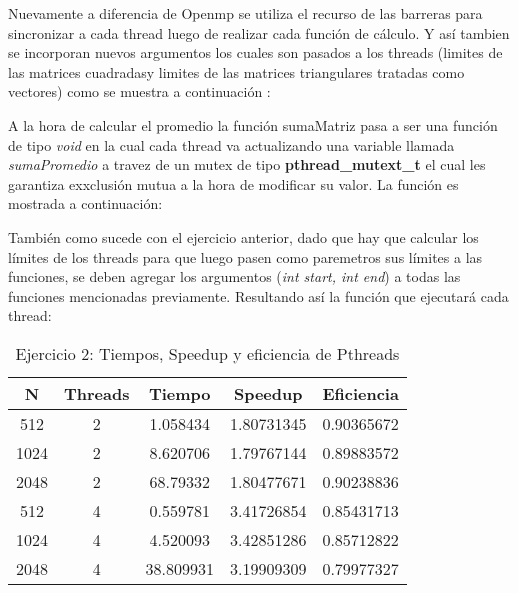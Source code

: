 Nuevamente a diferencia de Openmp se utiliza el recurso de las barreras para sincronizar a cada thread luego de realizar cada función de cálculo. Y así tambien se incorporan nuevos argumentos los cuales son pasados a los threads (limites de las matrices cuadradasy limites de las matrices triangulares tratadas como vectores) como se muestra a continuación :


A la hora de calcular el promedio la función sumaMatriz pasa a ser una función de tipo \textit{void} en la cual cada thread va actualizando una variable llamada \textit{sumaPromedio} a travez de un mutex de tipo \textbf{pthread\_mutext\_t} el cual les garantiza exxclusión mutua a la hora de modificar su valor. La función es mostrada a continuación:


También como sucede con el ejercicio anterior, dado que hay que calcular los límites de los threads para que luego pasen como paremetros sus límites a las funciones, se deben agregar los argumentos (\textit{int start, int end}) a todas las funciones mencionadas previamente. Resultando así la función que ejecutará cada thread:


\begin{table}[htbp]
\centering
\caption{Ejercicio 2: Tiempos, Speedup y eficiencia de Pthreads}
\begin{tabular}{|c|c|c|c|c|}
\hline
\textbf{N} & \textbf{Threads} & \textbf{Tiempo} & \textbf{Speedup} & \textbf{Eficiencia} \\ \hline
512        & 2                & 1.058434        & 1.80731345       & 0.90365672          \\ \hline
1024       & 2                & 8.620706        & 1.79767144       & 0.89883572          \\ \hline
2048       & 2                & 68.79332        & 1.80477671       & 0.90238836          \\ \hline
512        & 4                & 0.559781        & 3.41726854       & 0.85431713          \\ \hline
1024       & 4                & 4.520093        & 3.42851286       & 0.85712822          \\ \hline
2048       & 4                & 38.809931       & 3.19909309       & 0.79977327          \\ \hline
\end{tabular}
\end{table}
